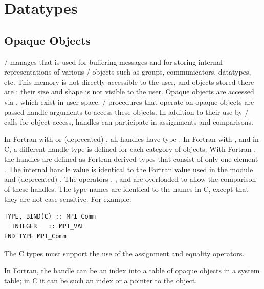 \section{Datatypes}

\subsection{Opaque Objects}
\label{terms:opaque-objects}

\MPI/ manages  that is used for buffering
messages and for storing internal representations of various \MPI/ objects
such as groups, communicators, datatypes, etc.
This memory is not directly accessible to the user, and objects stored
there are : their size and shape is not visible to the
user.  Opaque objects are accessed via , which exist in
user space.  \MPI/ procedures that operate on opaque objects are
passed handle arguments to access these objects.
In addition to their use by \MPI/ calls for object access, handles can
participate in assignments and comparisons.

In Fortran with  or (deprecated) ,
all handles have type .
In Fortran with , and in C, a
different handle type is defined for each category of objects.
With Fortran , the handles are defined
as Fortran  derived types that consist of only
one element  \code{::} . The internal handle
value is identical to the Fortran  value
used in the  module and (deprecated) .
The operators , , \code{==} and \code{/=} are
overloaded to allow the comparison of these handles.
The type names are identical to the names in C, except
that they are not case sensitive.
For example:
\begin{lstlisting}[language={[MPI08]Fortran}]
TYPE, BIND(C) :: MPI_Comm
  INTEGER   :: MPI_VAL
END TYPE MPI_Comm
\end{lstlisting}

The C types must support the use of the assignment and equality
operators.

\begin{implementors}
In Fortran, the handle can be an index into a table of opaque objects
in a system table; in C it can be such an index or a pointer to the
object.
\end{implementors}

